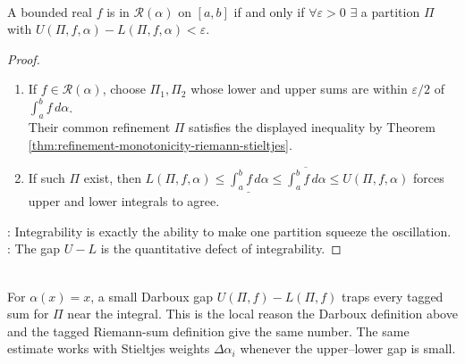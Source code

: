 \begin{theorem} \label{thm:riemann-stieltjes-integrability-criterion}\label{thm:riemann-stieltjes-main-source-todo} \\
A bounded real $f$ is in $\mathcal{R}(\alpha)$ on $[a,b]$ if and only if $\forall\varepsilon>0$ $\exists$ a partition $\Pi$ with $U(\Pi,f,\alpha)-L(\Pi,f,\alpha)<\varepsilon$.
\begin{proof}
\begin{enumerate}[label=\roman*.]
\setlength{\itemsep}{0pt}
\item[$(\Rightarrow)$] If $f\in\mathcal{R}(\alpha)$, choose $\Pi_1,\Pi_2$ whose lower and upper sums are within $\varepsilon/2$ of $\int_a^b f\,d\alpha$.\\
Their common refinement $\Pi$ satisfies the displayed inequality by Theorem \ref{thm:refinement-monotonicity-riemann-stieltjes}.
\item[$(\Leftarrow)$] If such $\Pi$ exist, then $L(\Pi,f,\alpha)\leq \underline{\int_a^b f\,d\alpha}\leq \overline{\int_a^b f\,d\alpha}\leq U(\Pi,f,\alpha)$ forces upper and lower integrals to agree.
\end{enumerate}
: Integrability is exactly the ability to make one partition squeeze the oscillation.\\
: The gap $U-L$ is the quantitative defect of integrability.
\end{proof}
\end{theorem}

\begin{perspective} \label{per:darboux-and-riemann-sum-definitions} \\
For $\alpha(x)=x$, a small Darboux gap $U(\Pi,f)-L(\Pi,f)$ traps every tagged sum for $\Pi$ near the integral. This is the local reason the Darboux definition above and the tagged Riemann-sum definition give the same number. The same estimate works with Stieltjes weights $\Delta\alpha_i$ whenever the upper--lower gap is small.
\end{perspective}

